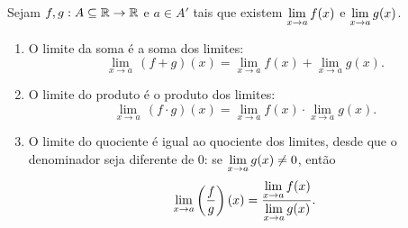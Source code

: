 \begin{theorem} \label{teo.calc1:algebra_dos_limites}
    Sejam $f,g : A \subseteq \mathbb{R} \to \mathbb{R}$ e $a \in A'$ tais que existem $\displaystyle \lim_{x \to a} f(x)$ e $\displaystyle \lim_{x \to a} g(x)$.
        \begin{enumerate}[leftmargin=*, align=left, label=\textbf{(\alph*)}]
            \item O limite da soma é a soma dos limites:
                \[
                    \lim_{x \to a} \, (f+g)(x) = \lim_{x \to a} f(x) + \lim_{x \to a} g(x).
                \]
            \item O limite do produto é o produto dos limites:
                \[
                    \lim_{x \to a} \, (f \cdot g)(x) = \lim_{x \to a} f(x) \cdot \lim_{x \to a} g(x).
                \]
            \item O limite do quociente é igual ao quociente dos limites, desde que o denominador seja diferente de $0$: se $\displaystyle \lim_{x \to a} g(x) \neq 0$, então
                \[
                    \lim_{x \to a} \left(\dfrac{f}{g} \right)(x) = \dfrac{\displaystyle \lim_{x \to a} f(x)}{\displaystyle \lim_{x \to a} g(x)}.
                \]
        \end{enumerate}
\end{theorem}

